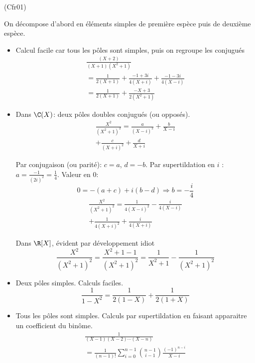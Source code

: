 \begin{tiny}(Cfr01)\end{tiny} On décompose d'abord en éléments simples de première espèce puis de deuxième espèce.
\begin{itemize}
 \item Calcul facile car tous les pôles sont simples, puis on regroupe les conjugués 
\begin{multline*}
\frac{(X+2)}{(X+1)(X^{2}+1)}\\
=\frac{1}{2(X+1)} +\frac{-1+3i}{4(X+i)} +\frac{-1-3i}{4(X-i)} \\
=\frac{1}{2(X+1)} + {\frac {-X+3}{2(X^{2}+1)}}
\end{multline*}

 \item Dans $\C(X)$: deux pôles doubles conjugués (ou opposés).
\begin{multline*}
\frac{X^2}{(X^2+1)^2}= \frac{a}{(X-i)^2} + \frac{b}{X-i} \\
+ \frac{c}{(X+i)^2} + \frac{d}{X+i}
\end{multline*}

Par conjugaison (ou parité): $c=a$, $d=-b$. Par supertildation en $i$ :$a=\frac{-1}{(2i)^2}=\frac{1}{4}$.\newline
Valeur en $0$:
\begin{displaymath}
 0= -(a+c)+i(b-d) \Rightarrow b=-\frac{i}{4}
\end{displaymath}
\begin{multline*}
\frac{X^2}{(X^2+1)^2}= \frac{1}{4(X-i)^2} - \frac{i}{4(X-i)} \\
+ \frac{1}{4(X+i)^2} + \frac{i}{4(X+i)}
\end{multline*}

Dans $\R[X]$, évident par développement idiot
\begin{displaymath}
 \frac{X^2}{(X^2+1)^2}=\frac{X^2+1-1}{(X^2+1)^2}=\frac{1}{X^2+1}-\frac{1}{(X^2+1)^2}
\end{displaymath}

 \item Deux pôles simples. Calculs faciles.
\begin{displaymath}
 \frac{1}{1-X^{2}}=\frac{1}{2(1-X)}+\frac{1}{2(1+X)}
\end{displaymath}

 \item Tous les pôles sont simples. Calculs par supertildation en faisant apparaitre un coefficient du binôme.
\begin{multline*}
\frac{1}{(X-1)(X-2)\cdots (X-n)}\\
=\frac{1}{(n-1)!}\sum_{i=0}^{n-1}\binom{n-1}{i-1}\frac{(-1)^{n-i}}{X-i}
\end{multline*}


\end{itemize}

